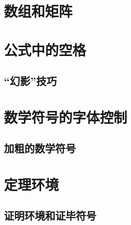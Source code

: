 \section{数组和矩阵}

\leavevmode\nobreakspace

\section{公式中的空格}

\leavevmode\nobreakspace

\subsection{“幻影”技巧}

\leavevmode\nobreakspace

\section{数学符号的字体控制}

\leavevmode\nobreakspace

\subsection{加粗的数学符号}

\leavevmode\nobreakspace

\section{定理环境}

\leavevmode\nobreakspace

\subsection{证明环境和证毕符号}

\leavevmode\nobreakspace

\endinput